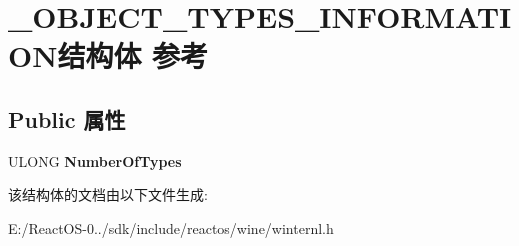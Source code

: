 \hypertarget{struct___o_b_j_e_c_t___t_y_p_e_s___i_n_f_o_r_m_a_t_i_o_n}{}\section{\+\_\+\+O\+B\+J\+E\+C\+T\+\_\+\+T\+Y\+P\+E\+S\+\_\+\+I\+N\+F\+O\+R\+M\+A\+T\+I\+O\+N结构体 参考}
\label{struct___o_b_j_e_c_t___t_y_p_e_s___i_n_f_o_r_m_a_t_i_o_n}
\subsection*{Public 属性}
\begin{DoxyCompactItemize}
\item 
\mbox{\label{struct___o_b_j_e_c_t___t_y_p_e_s___i_n_f_o_r_m_a_t_i_o_n_accd2f44b169d34248365a3f72daaf22f}} 
U\+L\+O\+NG {\bfseries Number\+Of\+Types}
\end{DoxyCompactItemize}


该结构体的文档由以下文件生成\+:\begin{DoxyCompactItemize}
\item 
E\+:/\+React\+O\+S-\/0../sdk/include/reactos/wine/winternl.\+h\end{DoxyCompactItemize}
